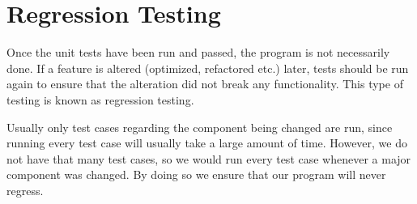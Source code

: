 \section{Regression Testing}
Once the unit tests have been run and passed, the program is not necessarily done.
If a feature is altered (optimized, refactored etc.) later, tests should be run again to ensure that the alteration did not break any functionality. This type of testing is known as regression testing.

Usually only test cases regarding the component being changed are run, since running every test case will usually take a large amount of time.
However, we do not have that many test cases, so we would run every test case whenever a major component was changed.
By doing so we ensure that our program will never regress.
